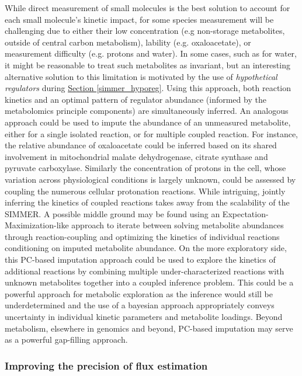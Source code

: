 While direct measurement of small molecules is the best solution to account for each small molecule's kinetic impact, for some species measurement will be challenging due to either their low concentration (e.g non-storage metabolites, outside of central carbon metabolism), lability (e.g. oxaloacetate), or measurement difficulty (e.g. protons and water). In some cases, such as for water, it might be reasonable to treat such metabolites as invariant, but an interesting alternative solution to this limitation is motivated by the use of \textit{hypothetical regulators} during \hyperref[simmer_hyporeg]{Section \ref{simmer_hyporeg}}. Using this approach, both reaction kinetics and an optimal pattern of regulator abundance (informed by the metabolomics principle components) are simultaneously inferred. An analogous approach could be used to impute the abundance of an unmeasured metabolite, either for a single isolated reaction, or for multiple coupled reaction.  For instance, the relative abundance of oxaloacetate could be inferred based on its shared involvement in mitochondrial malate dehydrogenase, citrate synthase and pyruvate carboxylase. Similarly the concentration of protons in the cell, whose variation across physiological conditions is largely unknown, could be assessed by coupling the numerous cellular protonation reactions. While intriguing, jointly inferring the kinetics of coupled reactions takes away from the scalability of the SIMMER. A possible middle ground may be found using an Expectation-Maximization-like approach to iterate between solving metabolite abundances through reaction-coupling and optimizing the kinetics of individual reactions conditioning on imputed metabolite abundance. On the more exploratory side, this PC-based imputation approach could be used to explore the kinetics of additional reactions by combining multiple under-characterized reactions with unknown metabolites together into a coupled inference problem. This could be a powerful approach for metabolic exploration as the inference would still be underdetermined and the use of a bayesian approach appropriately conveys uncertainty in individual kinetic parameters and metabolite loadings. Beyond metabolism, elsewhere in genomics and beyond, PC-based imputation may serve as a powerful gap-filling approach.

\subsubsection{Improving the precision of flux estimation}

